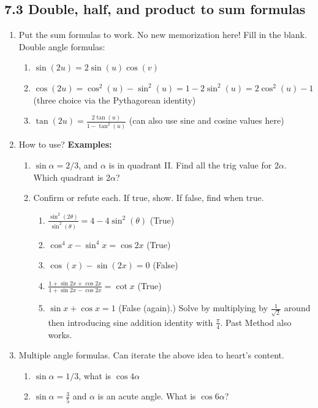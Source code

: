 \documentclass{article}
\begin{document}
\subsection{7.3 Double, half, and product to sum formulas}
\begin{enumerate}
\item Put the sum formulas to work. No new memorization here! Fill in the blank. Double angle formulas:
\begin{enumerate}
\item $\sin (2u)=2\sin(u)\cos(v)$
\item $\cos (2u)=\cos^2(u)-\sin^2(u)=1-2\sin^2(u)=2\cos^2(u)-1$ (three choice via the Pythagorean identity)
\item $\tan (2u)=\frac{2\tan(u)}{1-\tan^2(u)}$ (can also use sine and cosine values here)
\end{enumerate}

\item How to use? {\bf Examples:}
\begin{enumerate}
\item $\sin \alpha = 2/3$, and $\alpha$ is in quadrant II. Find all the trig value for $2\alpha$. Which quadrant is $2\alpha$?
\item Confirm or refute each. If true, show. If false, find when true.
\begin{enumerate}
\item $\frac{\sin^2(2\theta)}{\sin^2(\theta)}=4-4\sin^2(\theta)$ (True)
\item $\cos^4 x-\sin^4 x = \cos 2x$ (True)
\item $\cos(x)-\sin(2x) =  0$ (False)
\item $\frac{1+\sin2x+\cos 2x}{1+\sin 2x-\cos 2x} = \cot x$ (True)
\item $\sin x+\cos x = 1$ (False (again).) Solve by multiplying by $\frac{1}{\sqrt{2}}$ around then introducing sine addition identity with $\frac{\pi}{4}$. Past Method also works.
\end{enumerate}
\end{enumerate}

\item Multiple angle formulas. Can iterate the above idea to heart's content.
\begin{enumerate}
\item $\sin \alpha = 1/3$, what is $\cos 4\alpha$
\item $\sin \alpha = \frac{3}{5}$ and $\alpha$ is an acute angle. What is $\cos 6\alpha$?
\end{enumerate}


\end{enumerate}
\end{document}
